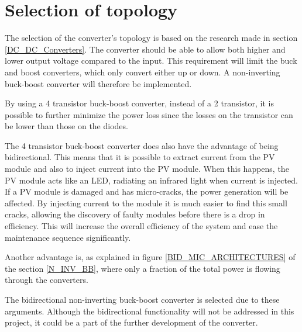 \section{Selection of topology}
The selection of the converter's topology is based on the research made in section \ref{DC_DC_Converters}. The converter should be able to allow both higher and lower output voltage compared to the input. This requirement will limit the buck and boost converters, which only convert either up or down. A non-inverting buck-boost converter will therefore be implemented.

By using a 4 transistor buck-boost converter, instead of a 2 transistor, it is possible to further minimize the power loss since the losses on the transistor can be lower than those on the diodes.

The 4 transistor buck-boost converter does also have the advantage of being bidirectional. This means that it is possible to extract current from the PV module and also to inject current into the PV module. When this happens, the PV module acts like an LED, radiating an infrared light when current is injected. If a PV module is damaged and has micro-cracks, the power generation will be affected. By injecting current to the module it is much easier to find this small cracks, allowing the discovery of faulty modules before there is a drop in efficiency. This will increase the overall efficiency of the system and ease the maintenance sequence significantly. \cite{selectionMPPT}


Another advantage is, as explained in figure \ref{BID_MIC_ARCHITECTURES} of the section \ref{N_INV_BB}, where only a fraction of the total power is flowing through the converters.

The bidirectional non-inverting buck-boost converter is selected due to these arguments. Although the bidirectional functionality will not be addressed in this project, it could be a part of the further development of the converter. 






 
